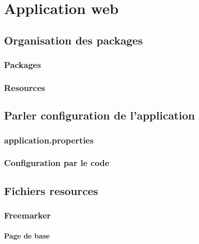 \chapter{Application web}

	\section{Organisation des packages}

		\subsection{Packages}


		\subsection{Resources}


	\section{Parler configuration de l'application}

		\subsection{application.properties}


		\subsection{Configuration par le code}


	\section{Fichiers resources}

		\subsection{Freemarker}

			\subsubsection{Page de base}


